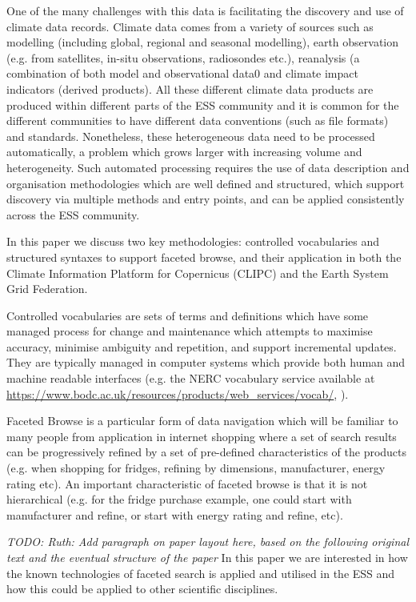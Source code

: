 \documentclass[final,1p,times,twocolumn,authoryear]{elsarticle}
\begin{document}
 One of the many challenges with this data is facilitating the discovery and use of climate data records. 
 Climate data comes from a variety of sources such as modelling (including global, regional and seasonal modelling), earth observation (e.g. from satellites, in-situ observations, radiosondes etc.), reanalysis (a combination of both model and observational data0 and climate impact indicators (derived products). 
 All these different climate data products are produced within different parts of the ESS community and it is common for the different communities to have different data conventions (such as file formats) and standards. 
 Nonetheless, these heterogeneous data need to be processed automatically, a problem which grows larger with increasing volume and heterogeneity. 
Such automated processing requires the use of data description and organisation methodologies which are well defined and structured, which support discovery via multiple methods and entry points, and can be applied consistently across the ESS community.

In this paper we discuss two key methodologies: controlled vocabularies and structured syntaxes to support faceted browse, and their application in both the Climate Information Platform for Copernicus (CLIPC) and the Earth System Grid Federation. 

Controlled vocabularies are sets of terms and definitions which have some managed process for change and maintenance which attempts to maximise accuracy, minimise ambiguity and repetition, and support incremental updates.
They are typically managed in computer systems which provide both human and machine readable interfaces (e.g. the NERC vocabulary service available at \href{https://www.bodc.ac.uk/resources/products/web\_services/vocab/}
{https://www.bodc.ac.uk/resources/products/web\_services/vocab/}, 
 \citealt{Latham2009, Leadbetter2012}). 

Faceted Browse is a particular form of data navigation which will be familiar to many people from application in internet shopping where a set of search results can be progressively refined by a set of pre-defined characteristics of the products (e.g. when shopping for fridges, refining by dimensions, manufacturer, energy rating etc).  An important characteristic of faceted browse is that it is not hierarchical (e.g. for the fridge purchase example, one could start with manufacturer and refine, or start with energy rating and refine, etc).

\textit{TODO: Ruth: Add paragraph on paper layout here, based on the following original text and the eventual structure of the paper}
In this paper we are interested in how the known technologies of faceted search is applied and utilised in the ESS and how this could be applied to other scientific disciplines.
\end{document}
